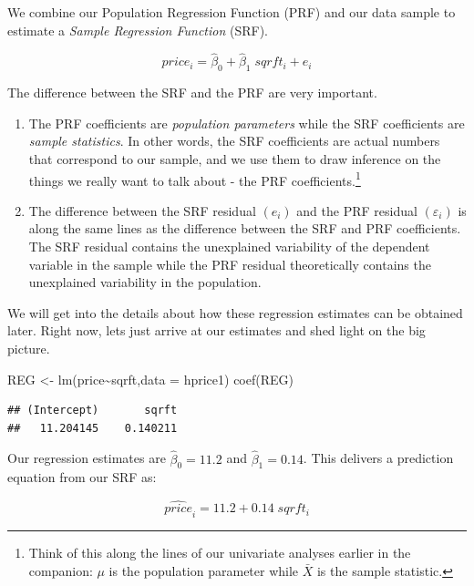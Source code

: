 \documentclass[
]{book}
\newenvironment{Shaded}{\begin{snugshade}}{\end{snugshade}}
\newcommand{\AttributeTok}[1]{\textcolor[rgb]{0.77,0.63,0.00}{#1}}
\newcommand{\FunctionTok}[1]{\textcolor[rgb]{0.00,0.00,0.00}{#1}}
\newcommand{\NormalTok}[1]{#1}
\newcommand{\OtherTok}[1]{\textcolor[rgb]{0.56,0.35,0.01}{#1}}
\newcommand{\SpecialCharTok}[1]{\textcolor[rgb]{0.00,0.00,0.00}{#1}}
\begin{document}
We combine our Population Regression Function (PRF) and our data sample to estimate a \emph{Sample Regression Function} (SRF).

\[price_i=\hat{\beta}_0+\hat{\beta}_1 \; sqrft_i+e_i\]

The difference between the SRF and the PRF are very important.

\begin{enumerate}
\def\labelenumi{\arabic{enumi}.}
\item
  The PRF coefficients are \emph{population parameters} while the SRF coefficients are \emph{sample statistics}. In other words, the SRF coefficients are actual numbers that correspond to our sample, and we use them to draw inference on the things we really want to talk about - the PRF coefficients.\footnote{Think of this along the lines of our univariate analyses earlier in the companion: \(\mu\) is the population parameter while \(\bar{X}\) is the sample statistic.}
\item
  The difference between the SRF residual \((e_i)\) and the PRF residual \((\varepsilon_i)\) is along the same lines as the difference between the SRF and PRF coefficients. The SRF residual contains the unexplained variability of the dependent variable in the sample while the PRF residual theoretically contains the unexplained variability in the population.
\end{enumerate}

We will get into the details about how these regression estimates can be obtained later. Right now, lets just arrive at our estimates and shed light on the big picture.

\begin{Shaded}
\begin{Highlighting}[]
\NormalTok{REG }\OtherTok{\textless{}{-}} \FunctionTok{lm}\NormalTok{(price}\SpecialCharTok{\textasciitilde{}}\NormalTok{sqrft,}\AttributeTok{data =}\NormalTok{ hprice1)}
\FunctionTok{coef}\NormalTok{(REG)}
\end{Highlighting}
\end{Shaded}

\begin{verbatim}
## (Intercept)       sqrft 
##   11.204145    0.140211
\end{verbatim}

Our regression estimates are \(\hat{\beta}_0=11.2\) and \(\hat{\beta}_1=0.14\). This delivers a prediction equation from our SRF as:

\[\hat{price}_i=11.2+0.14 \; sqrft_i\]
\end{document}
